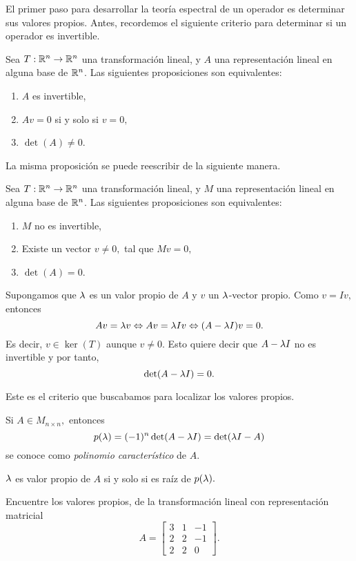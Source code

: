  El primer paso para desarrollar la teoría espectral de un operador es determinar sus valores
propios. Antes, recordemos el siguiente criterio para determinar si un operador es invertible.

\begin{prop}
 Sea $T:\mathbb{R}^{n}\to \mathbb{R}^{n}$ una transformación lineal, y $A$ una representación lineal en alguna base de $\mathbb{R}^{n}$. Las
siguientes proposiciones son equivalentes:
\begin{enumerate}
 \item $A$ es invertible,
 \item $Av=0$ si y solo si $v=0,$
 \item $\det(A)\neq 0$.
\end{enumerate}
\end{prop}

La misma proposición se puede reescribir de la siguiente manera.

\begin{prop}
 Sea $T:\mathbb{R}^{n}\to \mathbb{R}^{n}$ una transformación lineal, y $M$ una representación lineal en alguna base de $\mathbb{R}^{n}$. Las
siguientes proposiciones son equivalentes:
\begin{enumerate}
 \item $M$ no es invertible,
 \item Existe un vector $v\neq 0,$ tal que $Mv=0,$
 \item $\det(A)= 0$.
\end{enumerate}
\end{prop}



Supongamos que $\lambda$ es un valor propio de $A$ y $v$ un $\lambda$-vector propio. Como $v = Iv,$ entonces
$$
Av=\lambda v \Leftrightarrow Av=\lambda Iv \Leftrightarrow (A-\lambda I)v=0.
$$
Es decir, $v\in \ker(T)$ aunque $v\neq 0.$ Esto quiere decir que $A-\lambda I$ no es invertible y por tanto,
$$
\det(A-\lambda I)=0.
$$

Este es el criterio que buscabamos para localizar los valores propios.

\begin{defn}
 Si $A\in M_{n\times n},$ entonces
 $$
p(\lambda)=(-1)^{n}\det(A-\lambda I)=\det(\lambda I - A)
 $$
 se conoce como \emph{polinomio característico} de $A.$
\end{defn}

\begin{rem}
 $\lambda$ es valor propio de $A$ si y solo si es raíz de $p(\lambda).$
\end{rem}

\begin{problema}
 Encuentre los valores propios, de la transformación lineal con representación matricial
\begin{equation}
 \label{no:diagonal}
 A=\begin{bmatrix}
3 & 1 & -1 \\
2 & 2 & -1 \\
2 & 2 & 0
  \end{bmatrix}.
\end{equation}

\end{problema}

